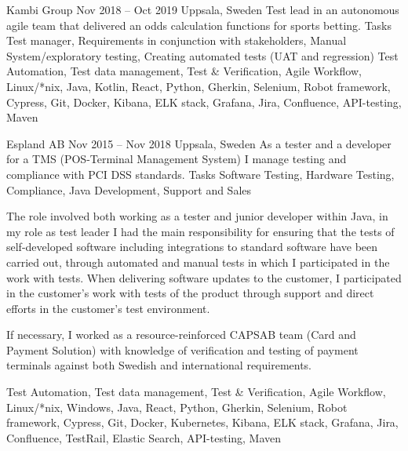 \documentclass{sobCV}[2015/09/08]
\begin{document}
{Kambi Group}
{Nov 2018 -- Oct 2019}
{Uppsala, Sweden}{
	Test lead in an autonomous agile team that delivered an odds calculation
	functions for sports betting.
}
{Tasks}{
	Test manager,
	Requirements in conjunction with stakeholders,
	Manual System/exploratory testing,
	Creating automated tests (UAT and regression)
}{  %
}{
	Test Automation,
	Test data management,
	Test \& Verification,
	Agile Workflow,
	Linux/*nix,
	Java,
	Kotlin,
	React,
	Python,
	Gherkin,
	Selenium,
	Robot framework,
	Cypress,
	Git,
	Docker,
	Kibana,
	ELK stack,
	Grafana,
	Jira,
	Confluence,
	API-testing,
	Maven
}

{Espland AB}
{Nov 2015 -- Nov 2018}
{Uppsala, Sweden}{
	As a tester and a developer for a TMS (POS-Terminal Management System) I
	manage testing and compliance with PCI DSS standards.
}
{Tasks}{
	Software Testing,
	Hardware Testing,
	Compliance,
	Java Development,
	Support and Sales
}{  %
	{
		The role involved both working as a tester and junior developer within
		Java, in my role as test leader I had the main responsibility for
		ensuring that the tests of self-developed software including
		integrations to standard software have been carried out, through
		automated and manual tests in which I participated in the work with
		tests.  When delivering software updates to the customer, I
		participated in the customer's work with tests of the product through
		support and direct efforts in the customer's test environment.

		If necessary, I worked as a  resource-reinforced CAPSAB team (Card
		and Payment Solution) with knowledge of verification and testing of
		payment terminals against both Swedish and international
		requirements.
	}
}{
	Test Automation,
	Test data management,
	Test \& Verification,
	Agile Workflow,
	Linux/*nix,
	Windows,
	Java,
	React,
	Python,
	Gherkin,
	Selenium,
	Robot framework,
	Cypress,
	Git,
	Docker,
	Kubernetes,
	Kibana,
	ELK stack,
	Grafana,
	Jira,
	Confluence,
	TestRail,
	Elastic Search,
	API-testing,
	Maven
}
\end{document}
